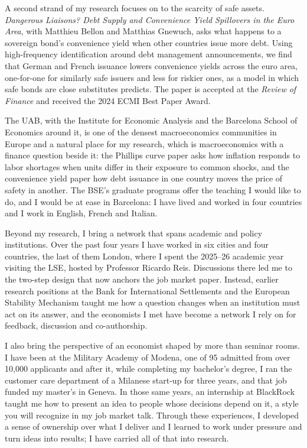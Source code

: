 \documentclass[11pt]{article}
\begin{document}
A second strand of my research focuses on to the scarcity of safe assets. \textit{Dangerous Liaisons? Debt Supply and Convenience Yield Spillovers in the Euro Area}, with Matthieu Bellon and Matthias Gnewuch, asks what happens to a sovereign bond's convenience yield when other countries issue more debt. Using high-frequency identification around debt management announcements, we find that German and French issuance lowers convenience yields across the euro area, one-for-one for similarly safe issuers and less for riskier ones, as a model in which safe bonds are close substitutes predicts. The paper is accepted at the \textit{Review of Finance} and received the 2024 ECMI Best Paper Award.

The UAB, with the Institute for Economic Analysis and the Barcelona School of Economics around it, is one of the densest macroeconomics communities in Europe and a natural place for my research, which is macroeconomics with a finance question beside it: the Phillips curve paper asks how inflation responds to labor shortages when units differ in their exposure to common shocks, and the convenience yield paper how debt issuance in one country moves the price of safety in another. The BSE's graduate programs offer the teaching I would like to do, and I would be at ease in Barcelona: I have lived and worked in four countries and I work in English, French and Italian.

Beyond my research, I bring a network that spans academic and policy institutions. Over the past four years I have worked in six cities and four countries, the last of them London, where I spent the 2025--26 academic year visiting the LSE, hosted by Professor Ricardo Reis. Discussions there led me to the two-step design that now anchors the job market paper. Instead, earlier research positions at the Bank for International Settlements and the European Stability Mechanism taught me how a question changes when an institution must act on its answer, and the economists I met have become a network I rely on for feedback, discussion and co-authorship.

I also bring the perspective of an economist shaped by more than seminar rooms. I have been at the Military Academy of Modena, one of 95 admitted from over 10,000 applicants and after it, while completing my bachelor's degree, I ran the customer care department of a Milanese start-up for three years, and that job funded my master's in Geneva. In those same years, an internship at BlackRock taught me how to present an idea to people whose decisions depend on it, a style you will recognize in my job market talk. Through these experiences, I developed a sense of ownership over what I deliver and I learned to work under pressure and turn ideas into results; I have carried all of that into research. %
\end{document}
